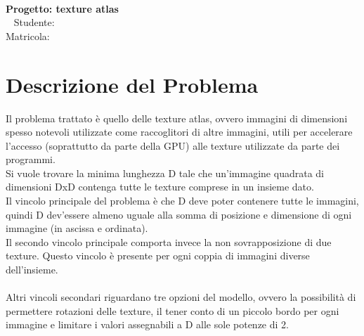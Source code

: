 

\begin{center}
	\hspace{0pt}
	\vfill
	\Huge{
		\textbf{\thetitle} \\
		\LARGE{\textbf{Progetto: texture atlas}} \\
		\ \newline \newline \newline
		\Large{	Studente: \textbf{\theauthor} } \\
		\normalsize{{Matricola: \textbf{\matNum}} }
	}
	\vfill
	\hspace{0pt}
\end{center}
\newpage




\tableofcontents    
\newpage





\section{Descrizione del Problema}



Il problema trattato è quello delle texture atlas, ovvero immagini di dimensioni spesso notevoli utilizzate come raccoglitori di altre immagini, utili per accelerare l’accesso (soprattutto da parte della GPU) alle texture utilizzate da parte dei programmi. \\
Si vuole trovare la minima lunghezza D tale che un’immagine quadrata di dimensioni DxD contenga tutte le texture comprese in un insieme dato. \\
Il vincolo principale del problema è che D deve poter contenere tutte le immagini, quindi D dev’essere almeno uguale alla somma di posizione e dimensione di ogni immagine (in ascissa e ordinata). \\
Il secondo vincolo principale comporta invece la non sovrapposizione di due texture. Questo vincolo è presente per ogni coppia di immagini diverse dell’insieme. \\
\ \\
Altri vincoli secondari riguardano tre opzioni del modello, ovvero la possibilità di permettere rotazioni delle texture, il tener conto di un piccolo bordo per ogni immagine e limitare i valori assegnabili a D alle sole potenze di 2.


\newpage

